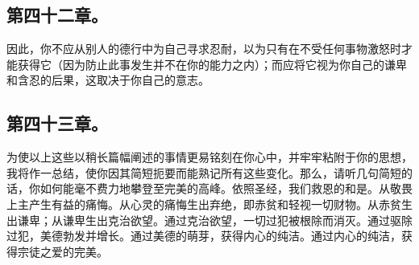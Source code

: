 
\subsection{第四十二章。}

\par

因此，你不应从别人的德行中为自己寻求忍耐，以为只有在不受任何事物激怒时才能获得它（因为防止此事发生并不在你的能力之内）；而应将它视为你自己的谦卑和含忍的后果，这取决于你自己的意志。\par


\subsection{第四十三章。}

\par

为使以上这些以稍长篇幅阐述的事情更易铭刻在你心中，并牢牢粘附于你的思想，我将作一总结，使你因其简短扼要而能熟记所有这些变化。那么，请听几句简短的话，你如何能毫不费力地攀登至完美的高峰。依照圣经，我们救恩的和是。从敬畏上主产生有益的痛悔。从心灵的痛悔生出弃绝，即赤贫和轻视一切财物。从赤贫生出谦卑；从谦卑生出克治欲望。通过克治欲望，一切过犯被根除而消灭。通过驱除过犯，美德勃发并增长。通过美德的萌芽，获得内心的纯洁。通过内心的纯洁，获得宗徒之爱的完美。\par



\section{}


